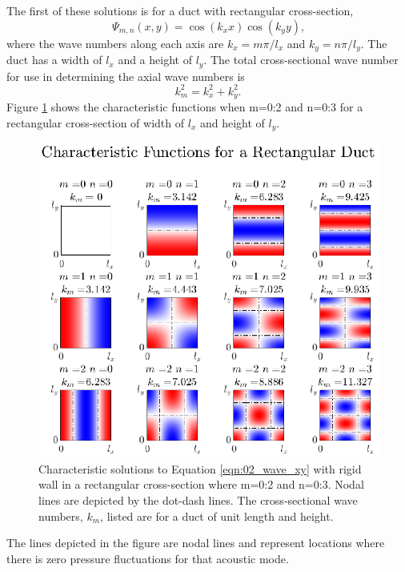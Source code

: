 The first of these solutions is for a duct with rectangular cross-section,
\begin{equation}
  \Psi_{m,n}(x,y) = \cos(k_xx)\cos(k_yy) \textrm{,}
  \label{eqn:02_psi_rect}
\end{equation}
where the wave numbers along each axis are $k_x = m\pi/l_x$ and $k_y = n\pi/l_y$.
The duct has a width of $l_x$ and a height of $l_y$.
The total cross-sectional wave number for use in determining the axial wave numbers is
\begin{equation}
  k_m^2 = k_x^2+k_y^2 \textrm{.}
  \label{eqn:02_wave_number_crosssection}
\end{equation}
Figure \ref{fig:02_cross_section_rect} shows the characteristic functions when m=0:2 and n=0:3 for a rectangular cross-section of width of $l_x$ and height of $l_y$.
\begin{figure}
  \centering
  \includegraphics[width=\textwidth]{../matlab/02_background/cross_section_rect.eps}
  \caption{Characteristic solutions to Equation \ref{eqn:02_wave_xy} with rigid wall in a rectangular cross-section where m=0:2 and n=0:3.  Nodal lines are depicted by the dot-dash lines.  The cross-sectional wave numbers, $k_m$, listed are for a duct of unit length and height.}
  \label{fig:02_cross_section_rect}
\end{figure}
The lines depicted in the figure are nodal lines and represent locations where there is zero pressure fluctuations for that acoustic mode.

